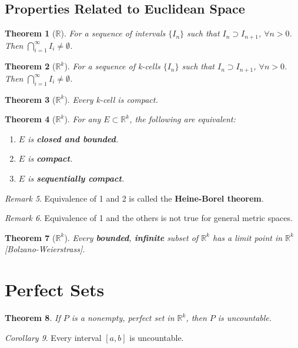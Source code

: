 \documentclass[a4paper,12pt]{report}
\newcommand{\R}{\mathbb{R}}
\newcommand{\tb}{\textbf}
\theoremstyle{plain}
\newtheorem{theorem}{\color{blue}Theorem}[chapter] %
\theoremstyle{definition}
\theoremstyle{remark}
\newtheorem{remark}[theorem]{\color{ForestGreen}Remark} %
\newtheorem{corollary}[theorem]{\color{SkyBlue}Corollary} %
\begin{document}
\subsection{Properties Related to Euclidean Space}
\begin{theorem}[$\R$]
For a sequence of intervals $\{I_n\}$ such that $I_n\supset I_{n+1}$, $\forall n>0$. Then $\bigcap_{i=1}^\infty I_i\neq\emptyset$.
\end{theorem}
\begin{theorem}[$\R^k$]
For a sequence of k-cells $\{I_n\}$ such that $I_n\supset I_{n+1}$, $\forall n>0$. Then $\bigcap_{i=1}^\infty I_i\neq\emptyset$.
\end{theorem}
\begin{theorem}[$\R^k$]
Every k-cell is compact.
\end{theorem}
\begin{theorem}[$\R^k$]
For any $E\subset \R^k$, the following are equivalent:
\begin{enumerate}
\item $E$ is \tb{closed and bounded}.
\item $E$ is \tb{compact}.
\item $E$ is \tb{sequentially compact}.
\end{enumerate}
\end{theorem}
\begin{remark}
Equivalence of 1 and 2 is called the \tb{Heine-Borel theorem}.
\end{remark}
\begin{remark}
Equivalence of 1 and the others is not true for general metric spaces.
\end{remark}
\begin{theorem}[$\R^k$]
Every \tb{bounded}, \tb{infinite} subset of $\R^k$ has a limit point in $\R^k$ [Bolzano-Weierstrass].
\end{theorem}

\section{Perfect Sets}
\begin{theorem}
If $P$ is a nonempty, perfect set in $\R^k$, then $P$ is uncountable.
\end{theorem}
\begin{corollary}
Every interval $[a,b]$ is uncountable.
\end{corollary}
\end{document}
